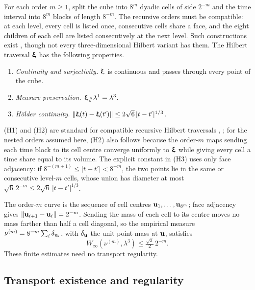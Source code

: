 For each order $m\geq1$, split the cube into $8^m$ dyadic cells of side $2^{-m}$ and the time interval into $8^m$ blocks of length $8^{-m}$. The recursive orders must be compatible: at each level, every cell is listed once, consecutive cells share a face, and the eight children of each cell are listed consecutively at the next level. Such constructions exist \cite{haverkort2017}, though not every three-dimensional Hilbert variant has them. The Hilbert traversal ${\bm{\mathrm{\upxi}}}$ \cite{hilbert1891,sagan1994,bader2013} has the following properties.
\begin{enumerate}[label=(H\arabic*)]
  \item \emph{Continuity and surjectivity.} ${\bm{\mathrm{\upxi}}}$ is continuous and passes through every point of the cube.
  \item \emph{Measure preservation.} ${\bm{\mathrm{\upxi}}}_\#\lambda^1=\lambda^3$.
  \item \emph{H\"older continuity.} $\|{\bm{\mathrm{\upxi}}}(t)-{\bm{\mathrm{\upxi}}}(t')\|\leq 2\sqrt6\,|t-t'|^{1/3}$.
\end{enumerate}
(H1) and (H2) are standard for compatible recursive Hilbert traversals \cite{sagan1994,bader2013}, \cite[Section~2.4]{haverkort2017}; for the nested orders assumed here, (H2) also follows because the order-$m$ maps sending each time block to its cell centre converge uniformly to ${\bm{\mathrm{\upxi}}}$ while giving every cell a time share equal to its volume. The explicit constant in (H3) uses only face adjacency: if $8^{-(m+1)}\leq|t-t'|<8^{-m}$, the two points lie in the same or consecutive level-$m$ cells, whose union has diameter at most $\sqrt6\,2^{-m}\leq2\sqrt6\,|t-t'|^{1/3}$.


The order-$m$ curve is the sequence of cell centres ${\bm{\mathrm{u}}}_1,\dots,{\bm{\mathrm{u}}}_{8^m}$; face adjacency gives $\|{\bm{\mathrm{u}}}_{i+1}-{\bm{\mathrm{u}}}_i\|=2^{-m}$. Sending the mass of each cell to its centre moves no mass farther than half a cell diagonal, so the empirical measure $\nu^{(m)}=8^{-m}\sum_i\delta_{{\bm{\mathrm{u}}}_i}$, with $\delta_{\bm{\mathrm{u}}}$ the unit point mass at ${\bm{\mathrm{u}}}$, satisfies
\begin{equation}
  \label{eq:vsfc-hilbert-coverage}
  W_\infty(\nu^{(m)},\lambda^3)\leq\tfrac{\sqrt3}{2}\,2^{-m}.
\end{equation}
These finite estimates need no transport regularity.

\subsection{Transport existence and regularity}
\label{sec:vsfc-ot}
\label{app:proofs-convex-transport}

